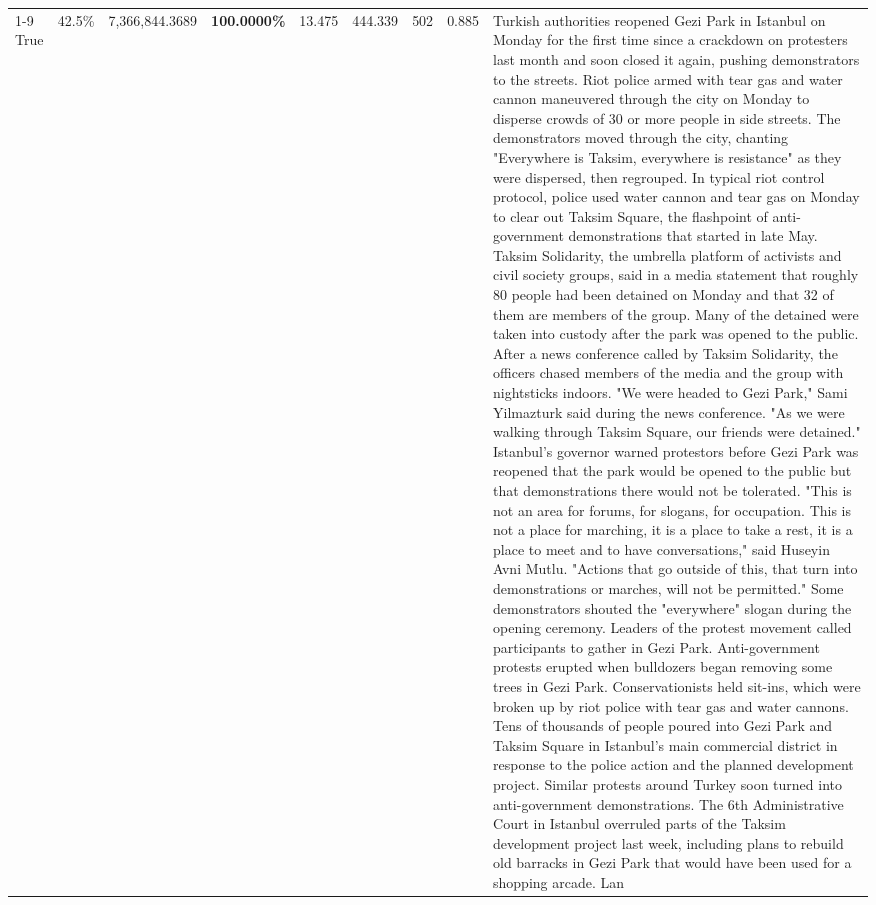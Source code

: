 \begin{table}[H]
\begin{tabular}{lllrlllll}
\cline{1-9}
True & 42.5\% & 7,366,844.3689 & \bfseries \color{red} 100.0000\% & 13.475 & 444.339 & 502 & 0.885 & Turkish authorities reopened Gezi Park in Istanbul on Monday for the first time since a crackdown on protesters last month and soon closed it again, pushing demonstrators to the streets. Riot police armed with tear gas and water cannon maneuvered through the city on Monday to disperse crowds of 30 or more people in side streets. The demonstrators moved through the city, chanting "Everywhere is Taksim, everywhere is resistance" as they were dispersed, then regrouped. In typical riot control protocol, police used water cannon and tear gas on Monday to clear out Taksim Square, the flashpoint of anti-government demonstrations that started in late May. Taksim Solidarity, the umbrella platform of activists and civil society groups, said in a media statement that roughly 80 people had been detained on Monday and that 32 of them are members of the group. Many of the detained were taken into custody after the park was opened to the public. After a news conference called by Taksim Solidarity, the officers chased members of the media and the group with nightsticks indoors. "We were headed to Gezi Park," Sami Yilmazturk said during the news conference. "As we were walking through Taksim Square, our friends were detained." Istanbul's governor warned protestors before Gezi Park was reopened that the park would be opened to the public but that demonstrations there would not be tolerated. "This is not an area for forums, for slogans, for occupation. This is not a place for marching, it is a place to take a rest, it is a place to meet and to have conversations," said Huseyin Avni Mutlu. "Actions that go outside of this, that turn into demonstrations or marches, will not be permitted." Some demonstrators shouted the "everywhere" slogan during the opening ceremony. Leaders of the protest movement called participants to gather in Gezi Park. Anti-government protests erupted when bulldozers began removing some trees in Gezi Park. Conservationists held sit-ins, which were broken up by riot police with tear gas and water cannons. Tens of thousands of people poured into Gezi Park and Taksim Square in Istanbul's main commercial district in response to the police action and the planned development project. Similar protests around Turkey soon turned into anti-government demonstrations. The 6th Administrative Court in Istanbul overruled parts of the Taksim development project last week, including plans to rebuild old barracks in Gezi Park that would have been used for a shopping arcade. Lan \\

\end{tabular}
\end{table}
